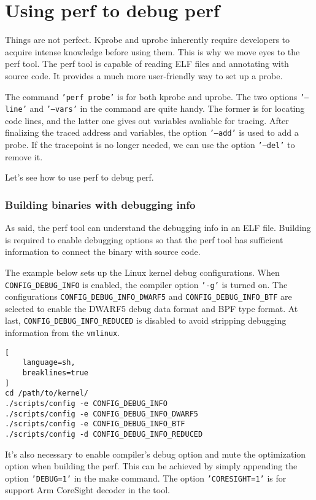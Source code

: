\documentclass[11pt]{diazessay} %
\def\code#1{\texttt{#1}}
\begin{document}
\section*{Using perf to debug perf}

Things are not perfect. Kprobe and uprobe inherently require developers to
acquire intense knowledge before using them. This is why we move eyes to the
perf tool. The perf tool is capable of reading ELF files and annotating with
source code. It provides a much more user-friendly way to set up a probe.

The command \code{'perf probe'} is for both kprobe and uprobe. The two
options \code{'---line'} and \code{'---vars'} in the command are quite handy.
The former is for locating code lines, and the latter one gives out variables
avaliable for tracing. After finalizing the traced address and variables, the
option \code{'---add'} is used to add a probe. If the tracepoint is no longer
needed, we can use the option \code{'---del'} to remove it.

Let's see how to use perf to debug perf.

\subsubsection*{Building binaries with debugging info}

As said, the perf tool can understand the debugging info in an ELF file.
Building is required to enable debugging options so that the perf tool has
sufficient information to connect the binary with source code.

The example below sets up the Linux kernel debug configurations. When
\code{CONFIG\_DEBUG\_INFO} is enabled, the compiler option \code{'-g'} is
turned on. The configurations \code{CONFIG\_DEBUG\_INFO\_DWARF5} and
\code{CONFIG\_DEBUG\_INFO\_BTF} are selected to enable the DWARF5 debug data
format and BPF type format. At last, \code{CONFIG\_DEBUG\_INFO\_REDUCED} is
disabled to avoid stripping debugging information from the \code{vmlinux}.

\begin{lstlisting}[
  	language=sh,
	breaklines=true
]
cd /path/to/kernel/
./scripts/config -e CONFIG_DEBUG_INFO
./scripts/config -e CONFIG_DEBUG_INFO_DWARF5
./scripts/config -e CONFIG_DEBUG_INFO_BTF
./scripts/config -d CONFIG_DEBUG_INFO_REDUCED
\end{lstlisting}

It's also necessary to enable compiler's debug option and mute the optimization
option when building the perf. This can be achieved by simply appending the
option \code{'DEBUG=1'} in the make command. The option \code{'CORESIGHT=1'} is
for support Arm CoreSight decoder in the tool.
\end{document}
